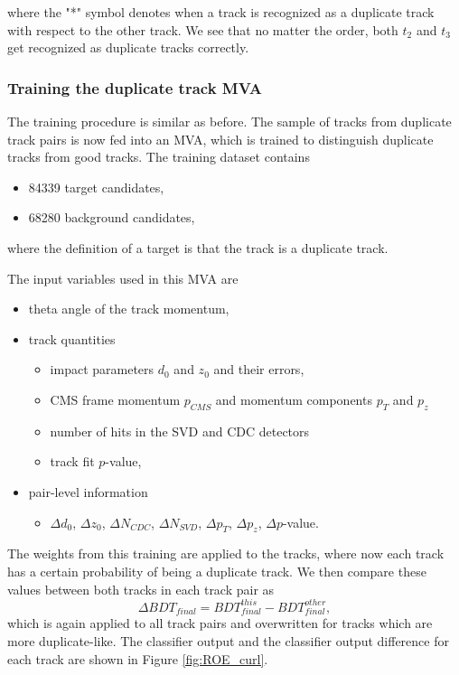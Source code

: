 where the "*" symbol denotes when a track is recognized as a duplicate track with respect to the other track. We see that no matter the order, both $t_2$ and $t_3$ get recognized as duplicate tracks correctly.

\subsubsection{Training the duplicate track MVA}
The training procedure is similar as before. The sample of tracks from duplicate track pairs is now fed into an MVA, which is trained to distinguish duplicate tracks from good tracks. The training dataset contains
\begin{itemize}
	\item 84339 target candidates,
	\item 68280 background candidates,
\end{itemize}
where the definition of a target is that the track is a duplicate track. 

The input variables used in this MVA are
\begin{itemize}
	\item theta angle of the track momentum,
	\item track quantities
	\begin{itemize}
		\item impact parameters $d_0$ and $z_0$ and their errors,
		\item CMS frame momentum $p_{CMS}$ and momentum components $p_T$ and $p_z$ 
		\item number of hits in the SVD and CDC detectors
		\item track fit $p$-value,
	\end{itemize}
	\item pair-level information
	\begin{itemize}
		\item $\Delta d_0$, $\Delta z_0$, $\Delta N_{CDC}$, $\Delta N_{SVD}$, $\Delta p_T$, $\Delta p_z$, $\Delta p$-value.  
	\end{itemize}
\end{itemize}

The weights from this training are applied to the tracks, where now each track has a certain probability of being a duplicate track. We then compare these values between both tracks in each track pair as
\begin{equation}
\Delta BDT_{final} = BDT_{final}^{this} - BDT_{final}^{other},
\end{equation}
which is again applied to all track pairs and overwritten for tracks which are more duplicate-like. The classifier output and the classifier output difference for each track are shown in Figure \ref{fig:ROE_curl}. 

